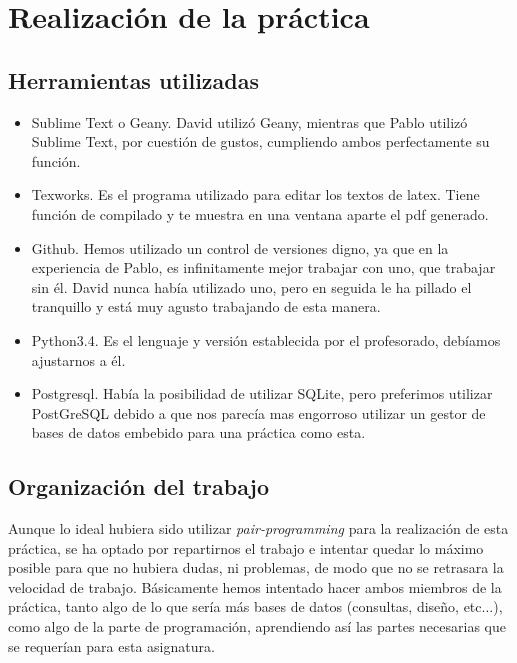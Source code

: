 \documentclass[11pt]{article} %
\begin{document}
\section{Realizaci\'on de la pr\'actica}

\subsection{Herramientas utilizadas}

\begin{itemize}

\item Sublime Text o Geany. David utilizó Geany, mientras que Pablo utilizó Sublime Text, por cuestión de gustos, cumpliendo ambos perfectamente su función.

\item Texworks. Es el programa utilizado para editar los textos de latex. Tiene funci\'on de compilado y te muestra en una ventana aparte el pdf generado.

\item Github. Hemos utilizado un control de versiones digno, ya que en la experiencia de Pablo, es infinitamente mejor trabajar con uno, que trabajar sin \'el. David nunca hab\'ia utilizado uno, pero en seguida le ha pillado el tranquillo y est\'a muy agusto trabajando de esta manera.

\item Python3.4. Es el lenguaje y versi\'on establecida por el profesorado, debíamos ajustarnos a \'el.

\item Postgresql. Hab\'ia la posibilidad de utilizar SQLite, pero preferimos utilizar PostGreSQL debido a que nos parecía mas engorroso utilizar un gestor de bases de datos embebido para una práctica como esta.

\end{itemize}

\subsection{Organizaci\'on del trabajo}

Aunque lo ideal hubiera sido utilizar \emph{pair-programming} para la realizaci\'on de esta pr\'actica, se ha optado por repartirnos el trabajo e intentar quedar lo m\'aximo posible para que no hubiera dudas, ni problemas, de modo que no se retrasara la velocidad de trabajo. B\'asicamente hemos intentado hacer ambos miembros de la pr\'actica, tanto algo de lo que ser\'ia m\'as bases de datos (consultas, dise\~no, etc...), como algo de la parte de programaci\'on, aprendiendo as\'i las partes necesarias que se requer\'ian para esta asignatura.
\end{document}
